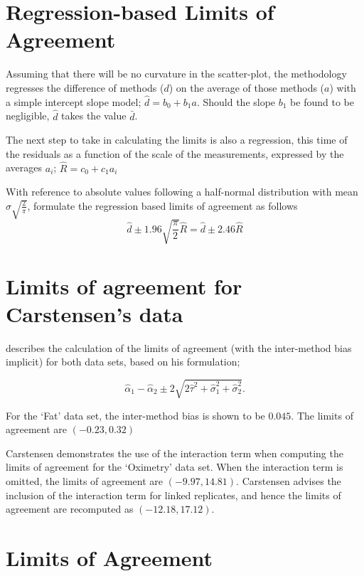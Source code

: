 \documentclass[Main.tex]{subfiles}
\begin{document}
	

\section{Regression-based Limits of Agreement} Assuming that
there will be no curvature in the scatter-plot, the methodology
regresses the difference of methods ($d$) on the average of those
methods ($a$) with a simple intercept slope model; $\hat{d} =
b_{0}+ b_{1}a.$ Should the slope $b_{1}$ be found to be
negligible, $\hat{d}$ takes the value $\bar{d}$.

The next step to take in calculating the limits is also a
regression, this time of the residuals as a function of the scale
of the measurements, expressed by the averages $a_{i}$;
$ \hat{R} = c_{0}+ c_{1}a_{i}$

With reference to absolute values following a half-normal
distribution with mean $\sigma\sqrt{\frac{2}{\pi}}$, \citet{BA99} formulate the regression based limits of agreement as
follows
\begin{equation}
\hat{d} \pm 1.96\sqrt{\frac{\pi}{2}}\hat{R} = \hat{d} \pm 2.46\hat{R}
\end{equation}

\section{Limits of agreement for Carstensen's data}


\citet{bxc2008} describes the calculation of the limits of agreement (with the inter-method bias implicit) for both data sets, based on his formulation;

\[\hat{\alpha}_1 - \hat{\alpha}_2 \pm 2\sqrt{2\hat{\tau}^2 +\hat{\sigma}_1^2 +\hat{\sigma}_2^2 }.\]

For the `Fat' data set, the inter-method bias is shown to be $0.045$. The limits of agreement are $(-0.23 , 0.32)$

Carstensen demonstrates the use of the interaction term when computing the limits of agreement for the `Oximetry' data set. When the interaction term is omitted, the limits of agreement are $(-9.97, 14.81)$. Carstensen advises the inclusion of the interaction term for linked replicates, and hence the limits of agreement are recomputed as $(-12.18,17.12)$.



\section{Limits of Agreement}
\end{document}
